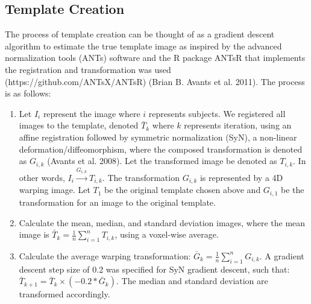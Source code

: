 \documentclass[]{elsarticle} %
\providecommand{\tightlist}{%
  \setlength{\itemsep}{0pt}\setlength{\parskip}{0pt}}
\begin{document}
\hypertarget{template-creation}{%
\subsection{Template Creation}\label{template-creation}}

The process of template creation can be thought of as a gradient descent algorithm to estimate the true template image as inspired by the advanced normalization tools (ANTs) software and the R package ANTsR that implements the registration and transformation was used (https://github.com/ANTsX/ANTsR) (Brian B. Avants et al. 2011). The process is as follows:

\begin{enumerate}
\def\labelenumi{\arabic{enumi}.}
\tightlist
\item
  Let \(I_{i}\) represent the image where \(i\) represents subjects. We registered all images to the template, denoted \(\bar{T}_{k}\) where \(k\) represents iteration, using an affine registration followed by symmetric normalization (SyN), a non-linear deformation/diffeomorphism, where the composed transformation is denoted as \(G_{i, k}\) (Avants et al. 2008). Let the transformed image be denoted as \(T_{i, k}\). In other words, \(I_{i}\overset{G_{i,k}}{\rightarrow}T_{i, k}\). The transformation \(G_{i, k}\) is represented by a 4D warping image. Let \(T_{1}\) be the original template chosen above and \(G_{i, 1}\) be the transformation for an image to the original template.
\item
  Calculate the mean, median, and standard deviation images, where the mean image is \(\bar{T}_{k} = \frac{1}{n} \sum\limits_{i = 1}^n T_{i, k}\), using a voxel-wise average.\\
\item
  Calculate the average warping transformation: \(\bar{G}_{k} = \frac{1}{n} \sum\limits_{i = 1}^n G_{i, k}\). A gradient descent step size of 0.2 was specified for SyN gradient descent, such that:
  \(\bar{T}_{k + 1} = \bar{T}_{k} \times \left(-0.2 * \bar{G}_{k}\right)\). The median and standard deviation are transformed accordingly.
\end{enumerate}
\end{document}
